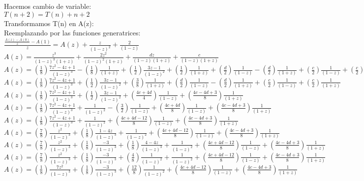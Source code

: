 \documentclass{article}
\begin{document}
\begin{enumerate}[label=\textbf{\alph*.}]
  Hacemos cambio de variable:\\
  $T(n+2)=T(n)+n+2$\\
  Transformamos T(n) en A(z):\\  
  Reemplazando por las funciones generatrices:\\
  $\frac{\frac{A(z) - A(0)}{z}-A(1)}{z} = A(z) + \frac{z}{(1-z)^2} + \frac{2}{(1-z)}$\\
  $A(z) = \frac{z^3}{(1-z)^3(1+z)} + \frac{2z^2}{(1-z)^2(1+z)} + \frac{dz}{(1-z)(1+z)} + \frac{c}{(1-z)(1+z)}$\\
  $A(z) = (\frac{1}{8})\frac{7z^2 - 4z + 1}{(1-z)^3} - (\frac{1}{8})\frac{1}{(1+z)} + (\frac{1}{2})\frac{3z-1}{(1-z)^2}+(\frac{1}{2})\frac{1}{(1+z)} + (\frac{d}{2})\frac{1}{(1-z)} - (\frac{d}{2})\frac{1}{(1+z)} + (\frac{c}{2})\frac{1}{(1-z)} + (\frac{c}{2})\frac{1}{(1+z)}$\\
  $A(z) = (\frac{1}{8})\frac{7z^2 - 4z + 1}{(1-z)^3} + (\frac{1}{2})\frac{3z-1}{(1-z)^2}+(\frac{3}{8})\frac{1}{(1+z)} + (\frac{d}{2})\frac{1}{(1-z)} - (\frac{d}{2})\frac{1}{(1+z)} + (\frac{c}{2})\frac{1}{(1-z)} + (\frac{c}{2})\frac{1}{(1+z)}$\\
  $A(z) = (\frac{1}{8})\frac{7z^2 - 4z + 1}{(1-z)^3} + (\frac{1}{2})\frac{3z-1}{(1-z)^2}+(\frac{4c+4d}{4})\frac{1}{(1-z)} + (\frac{4c-4d+3}{8})\frac{1}{(1+z)}$\\
  $A(z) = (\frac{1}{8})\frac{7z^2 - 4z + 1}{(1-z)^3} + \frac{1}{(1-z)^2} - (\frac{3}{2})\frac{1}{(1-z)}+(\frac{4c+4d}{8})\frac{1}{(1-z)} + (\frac{4c-4d+3}{8})\frac{1}{(1+z)}$\\
  $A(z) = (\frac{1}{8})\frac{7z^2 - 4z + 1}{(1-z)^3} + \frac{1}{(1-z)^2} +(\frac{4c+4d-12}{8})\frac{1}{(1-z)} + (\frac{4c-4d+3}{8})\frac{1}{(1+z)}$\\
  $A(z) = (\frac{7}{8})\frac{z^2}{(1-z)^3} + (\frac{1}{8})\frac{1-4z}{(1-z)^3} + \frac{1}{(1-z)^2} +(\frac{4c+4d-12}{8})\frac{1}{(1-z)} + (\frac{4c-4d+3}{8})\frac{1}{(1+z)}$\\
  $A(z) = (\frac{7}{8})\frac{z^2}{(1-z)^3} + (\frac{1}{8})\frac{-3}{(1-z)^3} + (\frac{1}{8})\frac{4-4z}{(1-z)^3} + \frac{1}{(1-z)^2} +(\frac{4c+4d-12}{8})\frac{1}{(1-z)} + (\frac{4c-4d+3}{8})\frac{1}{(1+z)}$\\
  $A(z) = (\frac{7}{8})\frac{z^2}{(1-z)^3} + (\frac{1}{8})\frac{-3}{(1-z)^3} + (\frac{4}{8})\frac{1}{(1-z)^2} + \frac{1}{(1-z)^2} +(\frac{4c+4d-12}{8})\frac{1}{(1-z)} + (\frac{4c-4d+3}{8})\frac{1}{(1+z)}$\\
  $A(z) = (\frac{1}{8})\frac{7z^2}{(1-z)^3} + (\frac{1}{8})\frac{-3}{(1-z)^3} + (\frac{12}{8})\frac{1}{(1-z)^2} + (\frac{4c+4d-12}{8})\frac{1}{(1-z)} + (\frac{4c-4d+3}{8})\frac{1}{(1+z)}$\\

\end{enumerate}
\end{document}
